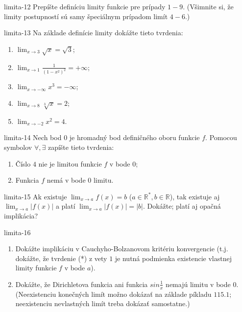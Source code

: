 \begin{defproblem}{limita-12}
Prepíšte definíciu limity funkcie pre prípady $1-9$. (Všimnite si, že limity postupností sú samy špeciálnym prípadom limít $4-6$.)
\end{defproblem}

\begin{defproblem}{limita-13}
Na základe definície limity dokážte tieto tvrdenia:
\begin{enumerate}
\item $\lim_{x \rightarrow 3} \sqrt{x}=\sqrt{3}$;
\item $\lim_{x \rightarrow 1} \frac{1}{(1-x^2)^2}=+\infty$;
\item $\lim_{x \rightarrow -\infty}x^3=-\infty$;
\item $\lim_{x \rightarrow 8} \sqrt[3]{x}=2$;
\item $\lim_{x \rightarrow -2} x^2=4$.
\end{enumerate}
\end{defproblem}

\begin{defproblem}{limita-14}
Nech bod $0$ je hromadný bod definičného oboru funkcie $f$. Pomocou symbolov $\forall, \exists$ zapíšte tieto tvrdenia:
\begin{enumerate}
\item Číslo $4$ nie je limitou funkcie $f$ v bode $0$;
\item Funkcia $f$ nemá v bode $0$ limitu.
\end{enumerate}
\end{defproblem}

\begin{defproblem}{limita-15}
Ak existuje $\lim_{x \rightarrow a} f(x)=b$ ($a \in \mathbb{R^*},b \in \mathbb{R}$), tak existuje aj $\lim_{x \rightarrow a} |f(x)|$ a platí $\lim_{x \rightarrow a} |f(x)|=|b|$. Dokážte; platí aj opačná implikácia?
\end{defproblem}

\begin{defproblem}{limita-16}
\begin{enumerate}
\item Dokážte implikáciu v Cauchyho-Bolzanovom kritériu konvergencie (t.j. dokážte, že tvrdenie (*) z vety $1$ je nutná podmienka existencie vlastnej limity funkcie $f$ v bode $a$).
\item Dokážte, že Dirichletova funkcia ani funkcia $sin \frac{1}{x}$ nemajú limitu v bode $0$. (Neexistenciu konečných limít možno dokázať na základe píkladu $115.1$; neexistenciu nevlastných limít treba dokázať samostatne.)
\end{enumerate}
\end{defproblem}

